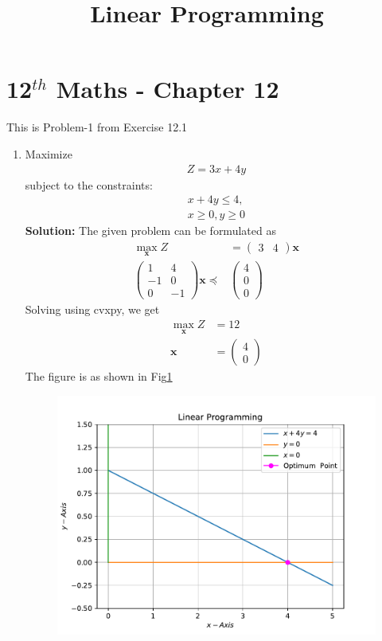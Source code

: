 \documentclass[12pt]{article}
\newcommand{\solution}{\noindent \textbf{Solution: }}
\newcommand{\myvec}[1]{\ensuremath{\begin{pmatrix}#1\end{pmatrix}}}
\let\vec\mathbf
\begin{document}
\begin{center}
\title{\textbf{Linear Programming}}
\date{\vspace{-5ex}} %
\maketitle
\end{center}
\setcounter{page}{1}

\section{12$^{th}$ Maths - Chapter 12}
This is Problem-1 from Exercise 12.1
\begin{enumerate}
\item Maximize
\begin{align}
	Z = 3x + 4y
\end{align}
subject to the constraints:
\begin{align}
	x+4y \leq 4, \\ 
	x \geq 0, y \geq 0
\end{align}
\solution 
The given problem can be formulated as 
\begin{align}
	\max_{\vec{x}} Z &= \myvec{3 & 4}\vec{x} \\
        \myvec{1 & 4\\
               -1 &0\\
	       0 & -1}\vec{x}\preceq & 
	\myvec{4 \\0\\0}
\end{align}
Solving using cvxpy, we get
\begin{align}
	\max_{\vec{x}} Z &= 12 \\
	\vec{x} & = \myvec{4  \\  0} 
\end{align}
The figure is as shown in Fig\ref{fig:Fig1}
\begin{figure}[!h]
	\begin{center}
		\includegraphics[width=\columnwidth]{figs/problem1.pdf}
	\end{center}
\caption{}
\label{fig:Fig1}
\end{figure}
\end{enumerate}
\end{document}
